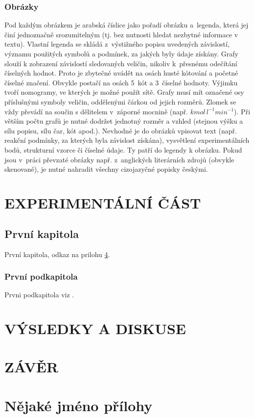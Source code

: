 \documentclass[a4paper, 12pt]{article}
\begin{document}
\subsubsection*{Obrázky}
Pod každým obrázkem je arabská číslice jako pořadí obrázku a~legenda, která jej činí jednoznačně srozumitelným (tj. bez nutnosti hledat nezbytné informace v textu). Vlastní legenda se skládá z~výstižného popisu uvedených závislostí, významu použitých symbolů a podmínek, za jakých byly údaje získány.
Grafy slouží k zobrazení závislostí sledovaných veličin, nikoliv k~přesnému odečítání číselných hodnot. Proto je zbytečné uvádět na osách husté kótování a početné číselné značení. Obvykle postačí na osách 5~kót a 3~číselné hodnoty. Výjimku tvoří nomogramy, ve kterých je možné použít sítě. 
Grafy musí mít označené osy příslušnými symboly veličin, oddělenými čárkou od jejich rozměrů. Zlomek se vždy převádí na součin s dělitelem v~záporné mocnině 
(např. $kmol\,l^{-1} min^{-1}$). 
Při větším počtu grafů je nutné dodržet jednotný rozměr a vzhled (stejnou výšku a sílu popisu, sílu čar, kót apod.). Nevhodné je do obrázků vpisovat text (např. reakční podmínky, za kterých byla závislost získána), vysvětlení experimentálních bodů, strukturní vzorce či číselné údaje. Ty patří do legendy k obrázku. 
Pokud jsou v~práci převzaté obrázky např. z~anglických literárních zdrojů (obvykle skenované), je nutné nahradit všechny cizojazyčné popisky českými. 


\newpage
\section{EXPERIMENTÁLNÍ ČÁST}

\subsection{První kapitola}
První kapitola, odkaz na prilohu \ref{PrilohaA}.

\subsubsection{První podkapitola}
Prvni podkapitola viz \cite{petz08}.

\newpage
\section{VÝSLEDKY A DISKUSE}

\newpage
\section{ZÁVĚR}


\newpage
{}



\newpage

\appendix

\section{Nějaké jméno přílohy}
\label{PrilohaA}
\end{document}
